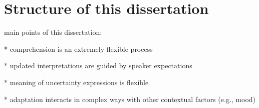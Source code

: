 \section{Structure of this dissertation}

main points of this dissertation:

* comprehension is an extremely flexible process 

* updated interpretations are guided by speaker expectations

* meaning of uncertainty expressions is flexible

* adaptation interacts in complex ways with other contextual factors (e.g., mood)

